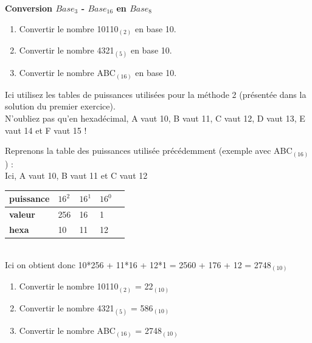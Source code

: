 \begin{Exercice}[15 minutes] \textbf{Conversion $Base_{3}$ - $Base_{16}$ en $Base_8$}
    \begin{enumerate}
        \item Convertir le nombre 10110$_{(2)}$ en base 10.
        \item Convertir le nombre 4321$_{(5)}$ en base 10.
        \item Convertir le nombre ABC$_{(16)}$ en base 10.
    \end{enumerate}
    \begin{conseil}
        Ici utilisez les tables de puissances utilisées pour la méthode 2 (présentée dans la solution du premier exercice). \\
        
        N'oubliez pas qu'en hexadécimal, A vaut 10, B vaut 11, C vaut 12, D vaut 13, E vaut 14 et F vaut 15 ! \\
    \end{conseil}
    \begin{solution}
        Reprenons la table des puissances utilisée précédemment (exemple avec ABC$_{(16)}$) : \\
        
        Ici, A vaut 10, B vaut 11 et C vaut 12 \\
        
        \begin{tabular}{| C{0.1\textwidth} | C{0.1\textwidth} | C{0.1\textwidth} | C{0.1\textwidth} | C{0.1\textwidth} |} 
            \hline
            \textbf{puissance} & $16^{2}$ & $16^{1}$ & $16^{0}$ \\ [0.5ex] 
            \hline
            \textbf{valeur} & 256 & 16 & 1 \\ [0.5ex] 
            \hline
            \textbf{hexa} & 10 & 11 & 12 \\ [0.5ex] 
            \hline
        \end{tabular} \\
        
        Ici on obtient donc 10*256 + 11*16 + 12*1 = 2560 + 176 + 12 = 2748$_{(10)}$ \\
        
        \begin{enumerate}
        \item Convertir le nombre 10110$_{(2)}$  = 22$_{(10)}$
        \item Convertir le nombre 4321$_{(5)}$ = 586$_{(10)}$
        \item Convertir le nombre ABC$_{(16)}$ = 2748$_{(10)}$
        \end{enumerate}
    
    \end{solution}

\end{Exercice}
\newpage

